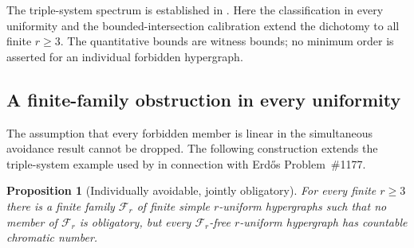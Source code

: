 \documentclass[a4paper,11pt,reqno]{amsart}
\theoremstyle{plain}
\newtheorem{proposition}[theorem]{Proposition}
\theoremstyle{definition}
\theoremstyle{remark}
\begin{document}
The triple-system spectrum is established in
\citet[Theorem~7.1]{li2026}.
Here the classification in every uniformity and the bounded-intersection
calibration extend the dichotomy to all finite $r\ge3$.
The quantitative bounds are witness bounds; no minimum order is
asserted for an individual forbidden hypergraph.

\subsection{A finite-family obstruction in every uniformity}
\label{exact-mixed-family-obstruction-section}

The assumption that every forbidden member is linear in the simultaneous
avoidance result cannot be dropped.  The following construction extends
the triple-system example used by \citet[Section~7]{li2026} in connection
with Erd\H{o}s Problem~\#1177.

\begin{proposition}[Individually avoidable, jointly obligatory]
\label{exact-mixed-family-obstruction}
For every finite $r\ge3$ there is a finite family $\mathcal F_r$ of
finite simple $r$-uniform hypergraphs such that no member of
$\mathcal F_r$ is obligatory, but every $\mathcal F_r$-free
$r$-uniform hypergraph has countable chromatic number.
\end{proposition}
\end{document}
